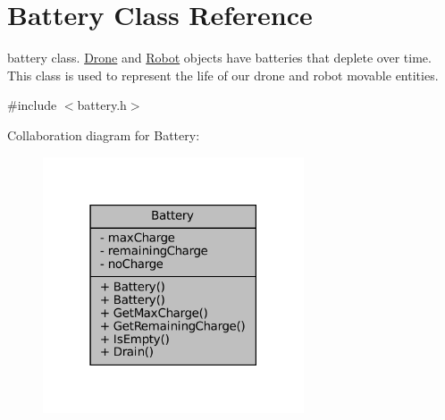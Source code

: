 \hypertarget{classBattery}{}\section{Battery Class Reference}
\label{classBattery}


battery class. \hyperlink{classDrone}{Drone} and \hyperlink{classRobot}{Robot} objects have batteries that deplete over time. This class is used to represent the life of our drone and robot movable entities.  




{\ttfamily \#include $<$battery.\+h$>$}



Collaboration diagram for Battery\+:\nopagebreak
\begin{figure}[H]
\begin{center}
\leavevmode
\includegraphics[width=219pt]{classBattery__coll__graph}
\end{center}
\end{figure}
